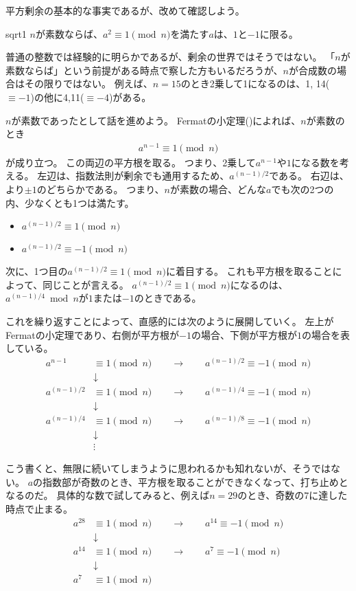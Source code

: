 平方剰余の基本的な事実であるが、改めて確認しよう。

\begin{Prop}{}{sqrt1}
$n$が素数ならば、$a^2 \equiv 1 \pmod{n}$を満たす$a$は、$1$と$-1$に限る。
\end{Prop}

普通の整数では経験的に明らかであるが、剰余の世界ではそうではない。
「$n$が素数ならば」という前提がある時点で察した方もいるだろうが、$n$が合成数の場合はその限りではない。
例えば、$n=15$のとき2乗して1になるのは、1, 14($\equiv-1$)の他に4,11($\equiv-4$)がある。

$n$が素数であったとして話を進めよう。
Fermatの小定理()によれば、$n$が素数のとき
\begin{align*}
a^{n-1} \equiv 1 \pmod{n}
\end{align*}
が成り立つ。
この両辺の平方根を取る。
つまり、2乗して$a^{n-1}$や$1$になる数を考える。
左辺は、指数法則が剰余でも通用するため、$a^{(n-1)/2}$である。
右辺は、より$\pm1$のどちらかである。
つまり、$n$が素数の場合、どんな$a$でも次の2つの内、少なくとも1つは満たす。
\begin{itemize}
 \item $a^{(n-1)/2} \equiv 1 \pmod{n}$
 \item $a^{(n-1)/2} \equiv -1 \pmod{n}$
\end{itemize}

次に、1つ目の$a^{(n-1)/2} \equiv 1 \pmod{n}$に着目する。
これも平方根を取ることによって、同じことが言える。
$a^{(n-1)/2} \equiv 1 \pmod{n}$になるのは、$a^{(n-1)/4}\bmod{n}$が$1$または$-1$のときである。

これを繰り返すことによって、直感的には次のように展開していく。
左上がFermatの小定理であり、右側が平方根が$-1$の場合、下側が平方根が$1$の場合を表している。
\begin{align*}
a^{n-1} &\equiv 1 \pmod{n} \qquad\to\qquad a^{(n-1)/2} \equiv -1 \pmod{n}\\
&\downarrow \\
a^{(n-1)/2} &\equiv 1 \pmod{n} \qquad\to\qquad a^{(n-1)/4} \equiv -1 \pmod{n} \\
&\downarrow \\
a^{(n-1)/4} &\equiv 1 \pmod{n} \qquad\to\qquad a^{(n-1)/8} \equiv -1 \pmod{n} \\
&\downarrow \\
&\vdots
\end{align*}

こう書くと、無限に続いてしまうように思われるかも知れないが、そうではない。
$a$の指数部が奇数のとき、平方根を取ることができなくなって、打ち止めとなるのだ。
具体的な数で試してみると、例えば$n=29$のとき、奇数の$7$に達した時点で止まる。
\begin{align*}
a^{28} &\equiv 1 \pmod{n} \qquad\to\qquad a^{14} \equiv -1 \pmod{n}\\
&\downarrow \\
a^{14} &\equiv 1 \pmod{n} \qquad\to\qquad a^{7} \equiv -1 \pmod{n} \\
&\downarrow \\
a^{7} &\equiv 1 \pmod{n}
\end{align*}

